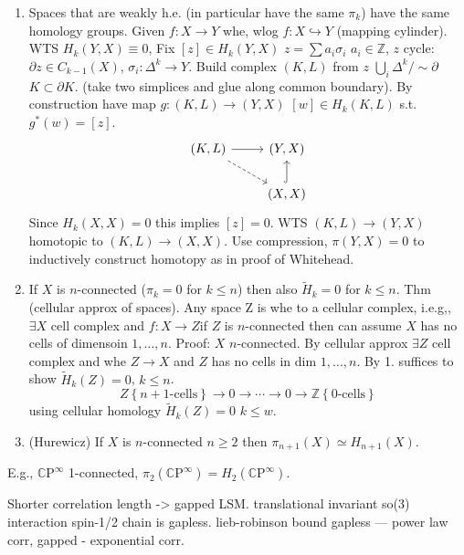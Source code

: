 \documentclass{report}
\begin{document}
\begin{enumerate}[itemsep=1pt]
\item Spaces that are weakly h.e. (in particular have the same $ \pi_k $) have 
	the same homology groups. Given $ f:X \to Y $ whe, wlog $ f: X \hookrightarrow Y $
	(mapping cylinder). WTS $ H_k(Y,X) \equiv 0 $, Fix $ [z] \in H_k(Y,X) $
	$ z=\sum a_i \sigma_i $ $ a_i \in \mathbb{Z} $, $ z $ cycle: $ \partial z \in 
	C_{k-1}(X)$, $ \sigma_i : \Delta^k \to Y $. Build complex $ (K,L) $ from $ z $
	$ \bigcup_i \Delta^k / \sim \partial $ $ K\subset \partial K $. (take two simplices 
	and glue along common boundary). By construction have map $ g:(K,L) \to (Y,X) $
	$ [w]\in H_k(K,L) $ s.t. $ g^\ast(w) = [z] $.  
	\begin{equation*}
		\begin{tikzcd}
		(K,L) \arrow[r] \arrow[dr, dashrightarrow]
		& (Y,X)\\
		& (X,X) \arrow[hook, u]
		\end{tikzcd}
	\end{equation*}
	Since $ H_k(X,X) = 0 $ this implies $ [z]=0 $. WTS $ (K,L)\to(Y,X) $
	homotopic to $ (K,L) \to (X,X) $. Use compression, $ \pi(Y,X) = 0 $
	to inductively construct homotopy as in proof of Whitehead.
\item If $ X $ is $ n $-connected ($ \pi_k=0 $ for $ k\leq n $)
	then also $ \tilde{H}_k=0 $ for $ k\leq n $. 
	Thm (cellular approx of spaces). Any space Z is whe to a cellular complex, 
	i.e.g,, $ \exists X $ cell complex and $ f:X \to Z $if $ Z $ is $ n $-connected 
	then can assume $X$ has no cells of dimensoin $ 1,\dots,n $. 
	Proof: $ X $ $ n $-connected. By cellular approx $ \exists Z $ cell complex 
	and whe $ Z\to X $ and $ Z $ has no cells in dim $ 1,\dots,n $. By 1.
	suffices to show $ \tilde{H}_k(Z) = 0 $, $ k\leq n $. 
	\begin{equation*}
		Z\left\{n+1\text{-cells}\right\}
		\to 0 \to \cdots \to 0\to\mathbb{Z}\left\{0\text{-cells}\right\}
	\end{equation*}
	using cellular homology $ \tilde{H}_k(Z)=0 $ $ k\leq w $. 
\item (Hurewicz) If $ X $ is $ n $-connected $ n\geq 2 $ then $ \pi_{n+1} (X)
\simeq H_{n+1}(X)$. 
\end{enumerate}



E.g., $ \mathbb{C}\text{P}^\infty $ 1-connected, $\pi_2(\mathbb{C}\text{P}^\infty) 
= H_2(\mathbb{C}\text{P}^\infty) $. 


Shorter correlation length -> gapped
LSM. translational invariant so(3) interaction spin-1/2 chain is gapless. 
lieb-robinson bound 
gapless --- power law corr, gapped - exponential corr.
\end{document}
